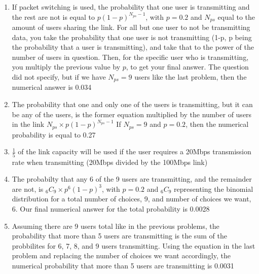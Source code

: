 \documentclass[14pt]{article}
\begin{document}
\begin{enumerate}
\begin{enumerate}[1.]
\item
If packet switching is used, the probability that one user is transmitting and the rest are not is equal to $p(1-p)^{N_{ps} - 1}$, with $p = 0.2$ and $N_{ps}$ equal to the amount of users sharing the link. For all but one user to not be transmitting data, you take the probability that one user is not transmitting (1-p, p being the probability that a user is transmitting), and take that to the power of the number of users in question. Then, for the specific user who is transmitting, you multiply the previous value by $p$, to get your final answer. The question did not specify, but if we have $N_{ps} = 9$ users like the last problem, then the numerical answer is 0.034

\item
The probability that one and only one of the users is transmitting, but it can be any of the users, is the former equation multiplied by the number of users in the link 
$N_{ps} \times p(1-p)^{N_{ps}-1}$
If $N_{ps} = 9$ and $p = 0.2$, then the numerical probability is equal to 0.27

\item
$\frac{1}{5}$ of the link capacity will be used if the user requires a 20Mbps transmission rate when transmitting (20Mbps divided by the 100Mbps link)

\item
The probabilty that any 6 of the 9 users are transmitting, and the remainder are not, is $_6C_9 \times p^6(1-p)^3$, with $p = 0.2$ and $_6C_9$ representing the binomial distribution for a total number of choices, 9, and number of choices we want, 6. Our final numerical answer for the total probability is 0.0028

\item
Assuming there are 9 users total like in the previous problems, the probability that more than 5 users are transmitting is the sum of the probbilites for 6, 7, 8, and 9 users transmitting. Using the equation in the last problem and replacing the number of choices we want accordingly, the numerical probability that more than 5 users are transmitting is 0.0031


\end{enumerate}



\end{enumerate}
\end{document}
